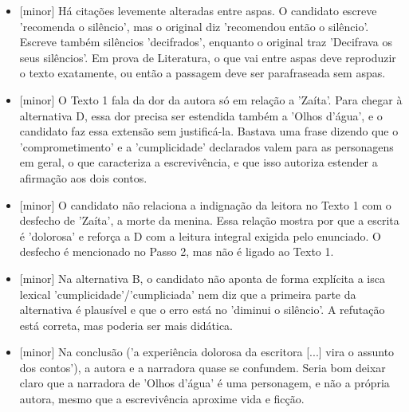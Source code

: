 \documentclass{article}%
\begin{document}
\begin{itemize}%
\item%
{[}minor{]} Há citações levemente alteradas entre aspas. O candidato escreve 'recomenda o silêncio', mas o original diz 'recomendou então o silêncio'. Escreve também silêncios 'decifrados', enquanto o original traz 'Decifrava os seus silêncios'. Em prova de Literatura, o que vai entre aspas deve reproduzir o texto exatamente, ou então a passagem deve ser parafraseada sem aspas.%
\item%
{[}minor{]} O Texto 1 fala da dor da autora só em relação a 'Zaíta'. Para chegar à alternativa D, essa dor precisa ser estendida também a 'Olhos d'água', e o candidato faz essa extensão sem justificá{-}la. Bastava uma frase dizendo que o 'comprometimento' e a 'cumplicidade' declarados valem para as personagens em geral, o que caracteriza a escrevivência, e que isso autoriza estender a afirmação aos dois contos.%
\item%
{[}minor{]} O candidato não relaciona a indignação da leitora no Texto 1 com o desfecho de 'Zaíta', a morte da menina. Essa relação mostra por que a escrita é 'dolorosa' e reforça a D com a leitura integral exigida pelo enunciado. O desfecho é mencionado no Passo 2, mas não é ligado ao Texto 1.%
\item%
{[}minor{]} Na alternativa B, o candidato não aponta de forma explícita a isca lexical 'cumplicidade'/'cumpliciada' nem diz que a primeira parte da alternativa é plausível e que o erro está no 'diminui o silêncio'. A refutação está correta, mas poderia ser mais didática.%
\item%
{[}minor{]} Na conclusão ('a experiência dolorosa da escritora {[}...{]} vira o assunto dos contos'), a autora e a narradora quase se confundem. Seria bom deixar claro que a narradora de 'Olhos d'água' é uma personagem, e não a própria autora, mesmo que a escrevivência aproxime vida e ficção.%
\end{itemize}%
\end{document}
